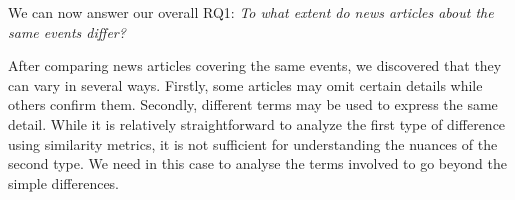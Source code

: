 We can now answer our overall RQ1: \emph{To what extent do news articles about the same events differ?}

After comparing news articles covering the same events, we discovered that they can vary in several ways. Firstly, some articles may omit certain details while others confirm them. Secondly, different terms may be used to express the same detail. While it is relatively straightforward to analyze the first type of difference using similarity metrics, it is not sufficient for understanding the nuances of the second type. We need in this case to analyse the terms involved to go beyond the simple differences.






